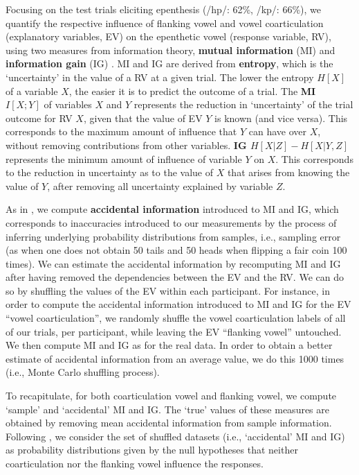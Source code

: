 Focusing on the test trials eliciting epenthesis (/hp/: 62\%, /kp/: 66\%), we quantify the respective influence of flanking vowel and vowel coarticulation (explanatory variables, EV) on the epenthetic vowel (response variable, RV), using two measures from information theory, \textbf{mutual information} (MI) and \textbf{information gain} (IG) \cite[see][for a comprehensive description of these measures]{daland2015}. MI and IG are derived from \textbf{entropy}, which is the `uncertainty' in the value of a RV at a given trial. The lower the entropy $H[X]$ of a variable $X$, the easier it is to predict the outcome of a trial. The \textbf{MI $I[X;Y]$} of variables $X$ and $Y$ represents the reduction in `uncertainty' of the trial outcome for RV $X$, given that the value of EV $Y$ is known (and vice versa). This corresponds to the maximum amount of influence that $Y$ can have over $X$, without removing contributions from other variables. \textbf{IG $H[X|Z] - H[X|Y,Z]$} represents the minimum amount of influence of variable $Y$ on $X$. This corresponds to the reduction in uncertainty as to the value of $X$ that arises from knowing the value of $Y$, after removing all uncertainty explained by variable $Z$. 

As in \cite{daland2015}, we compute \textbf{accidental information} introduced to MI and IG, which corresponds to inaccuracies introduced to our measurements by the process of inferring underlying probability distributions from samples, i.e., sampling error (as when one does not obtain 50 tails and 50 heads when flipping a fair coin 100 times).
We can estimate the accidental information by recomputing MI and IG after having removed the dependencies between the EV and the RV. We can do so by shuffling the values of the EV within each participant. For instance, in order to compute the accidental information introduced to MI and IG for the EV ``vowel coarticulation'', we randomly shuffle the vowel coarticulation labels of all of our trials, per participant, while leaving the EV ``flanking vowel'' untouched. We then compute MI and IG as for the real data. In order to obtain a better estimate of accidental information from an average value, we do this 1000 times (i.e., Monte Carlo shuffling process). 

To recapitulate, for both coarticulation vowel and flanking vowel, we compute `sample' and `accidental' MI and IG. The `true' values of these measures are obtained by removing mean accidental information from sample information. Following \cite{daland2015}, we consider the set of shuffled datasets (i.e., `accidental' MI and IG) as probability distributions given by the null hypotheses that neither coarticulation nor the flanking vowel influence the responses. 

